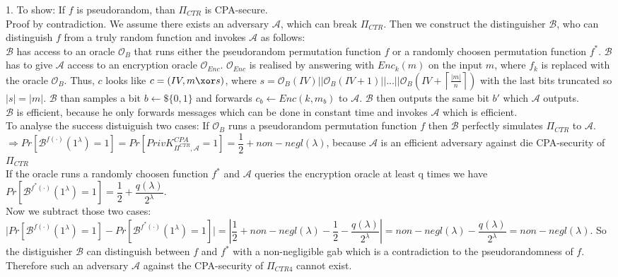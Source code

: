 1. To show: If \(f\) is pseudorandom, than \(\Pi_{CTR}\) is CPA-secure. \\
Proof by contradiction. We assume there exists an adversary \(\mathcal{A}\), which can break \(\Pi_{CTR}\). Then we construct the distinguisher \(\mathcal{B}\), who can distinguish \(f\) from a truly random function and invokes \(\mathcal{A}\) as follows: \\
\(\mathcal{B}\) has access to an oracle \(\mathcal{O}_{B}\) that runs either the pseudorandom permutation function \(f\) or a randomly choosen permutation function \(f^*\).
\(\mathcal{B}\) has to give \(\mathcal{A}\) access to an encryption oracle \(\mathcal{O}_{Enc}\). \(\mathcal{O}_{Enc}\) is realised by answering with \(Enc_k(m)\) on the input \(m\), where \(f_k\) is replaced with the oracle \(\mathcal{O}_{B}\). Thus, \(c\) looks like \(c = (IV, m \xor s)\), where \(s = \mathcal{O}_{B}(IV) \vert\vert \mathcal{O}_{B}(IV + 1) \vert\vert ... \vert\vert \mathcal{O}_{B}\left(IV + \left\lceil \frac{\vert m \vert}{n}\right \rceil \right) \) 
with the last bits truncated so \(\vert s \vert = \vert m \vert\).
\(\mathcal{B}\) than samples a bit \(b \leftarrow\$ \{0,1\}\) and forwards \(c_b \leftarrow Enc(k, m_b)\) to \(\mathcal{A}\). \(\mathcal{B}\) then outputs the same bit \(b'\) which \(\mathcal{A}\) outputs. \\
\(\mathcal{B}\) is efficient, because he only forwards messages which can be done in constant time and invokes \(\mathcal{A}\) which is efficient.\\
To analyse the success distuiguish two cases: If \(\mathcal{O}_{B}\) runs a pseudorandom permutation function \(f\) then \(\mathcal{B}\) perfectly simulates \(\Pi_{CTR}\) to \(\mathcal{A}\). \(\Rightarrow Pr[\mathcal{B}^{f(\cdot)}(1^\lambda) = 1] = Pr[PrivK^{CPA}_{\Pi^{CTR},\mathcal{A}} = 1] = \dfrac{1}{2} + non-negl(\lambda)\), because \(\mathcal{A}\) is an efficient adversary against die CPA-security of \(\Pi_{CTR}\)\\
If the oracle runs a randomly choosen function \(f^*\) and \(\mathcal{A}\) queries the encryption oracle at least q times we have \(Pr[\mathcal{B}^{f^*(\cdot)}(1^\lambda) = 1] = \dfrac{1}{2} + \dfrac{q(\lambda)}{2^\lambda}\).\\
Now we subtract those two cases:\\
\(\vert Pr[\mathcal{B}^{f(\cdot)}(1^\lambda) = 1] - Pr[\mathcal{B}^{f^*(\cdot)}(1^\lambda) = 1] \vert = \left\vert \dfrac{1}{2} + non-negl(\lambda) - \dfrac{1}{2} - \dfrac{q(\lambda)}{2^\lambda} \right\vert = non-negl(\lambda) - \dfrac{q(\lambda)}{2^\lambda} = non-negl(\lambda) \). So the distiguisher \(\mathcal{B}\) can distinguish between \(f\) and \(f^*\) with a non-negligible gab which is a contradiction to the pseudorandomness of \(f\). Therefore such an adversary \(\mathcal{A}\) against the CPA-security of \(\Pi_{CTR4}\) cannot exist.\\
